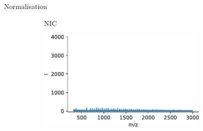 \documentclass[10pt]{beamer}
\begin{document}
\begin{frame}{Normalisation}
\begin{figure}[ht]
\begin{subfigure}[t]{0.3\textwidth}
      \caption{NIC}
      \label{subfig:real_sic}
    \end{subfigure}%
    \begin{subfigure}[t]{0.35\textwidth}
      \centering \includegraphics[width=0.9\textwidth]{fig/real_defect}
      \caption{}
      \label{subfig:real_defect}
    \end{subfigure}%
  \end{figure}
\end{frame}
\end{document}
